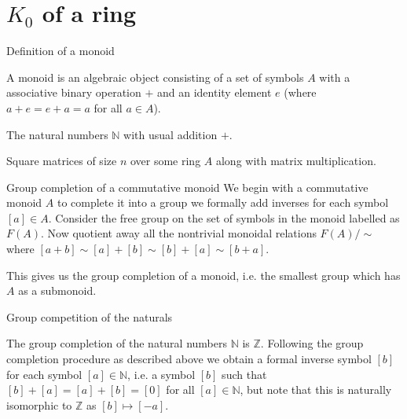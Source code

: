 \documentclass{beamer}
\newcommand{\Z}{\mathbb{Z}}
\newcommand{\N}{\mathbb{N}}
\begin{document}
\section{$K_0$ of a ring}
\begin{frame}{Definition of a monoid}
	\begin{definition}[Monoid]
			A monoid is an algebraic object consisting of a set of symbols $A$ with a associative binary operation $+$ and an identity element $e$ (where $a+e=e+a=a$ for all $a \in A$).
	\end{definition}
\begin{example} The natural numbers $\N$ with usual addition $+$.
\end{example}
\begin{example}
	Square matrices of size $n$ over some ring $A$ along with matrix multiplication.
\end{example}
\end{frame}

\begin{frame}{Group completion of a commutative monoid}
	We begin with a commutative monoid $A$ to complete it into a group we formally add inverses for each symbol $[a]\in A$. Consider the free group on the set of symbols in the monoid labelled as $F(A)$. Now quotient away all the nontrivial monoidal relations $F(A)/\sim $ where $[a+b]\sim [a]+[b] \sim [b]+[a] \sim [b+a]$. 
	
	This gives us the group completion of a monoid, i.e. the smallest group which has $A$ as a submonoid.
	
\end{frame}



\begin{frame}{Group competition of the naturals}
	
		The group completion of the natural numbers $\N$ is $\Z$. Following the group completion procedure as described above we obtain a formal inverse symbol $[b]$ for each symbol $[a] \in \N $, i.e. a symbol $[b]$ such that $[b]+[a]=[a]+[b]=[0]$ for all $[a] \in \N$, but note that this is naturally isomorphic to $\Z $ as $[b] \mapsto [-a]$.

\end{frame}
\end{document}
